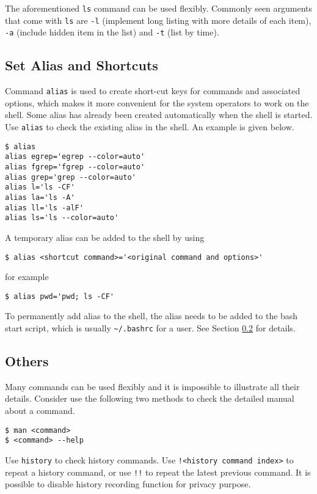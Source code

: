 The aforementioned \verb|ls| command can be used flexibly. Commonly seen arguments that come with \verb|ls| are \verb|-l| (implement long listing with more details of each item), \verb|-a| (include hidden item in the list) and \verb|-t| (list by time).

\subsection{Set Alias and Shortcuts}

Command \verb|alias| is used to create short-cut keys for commands and associated options, which makes it more convenient for the system operators to work on the shell. Some alias has already been created automatically when the shell is started. Use \verb|alias| to check the existing alias in the shell. An example is given below.

\begin{verbatim}
$ alias
alias egrep='egrep --color=auto'
alias fgrep='fgrep --color=auto'
alias grep='grep --color=auto'
alias l='ls -CF'
alias la='ls -A'
alias ll='ls -alF'
alias ls='ls --color=auto'
\end{verbatim}

A temporary alias can be added to the shell by using
\begin{verbatim}
$ alias <shortcut command>='<original command and options>'
\end{verbatim}
for example
\begin{verbatim}
$ alias pwd='pwd; ls -CF'
\end{verbatim}

To permanently add alias to the shell, the alias needs to be added to the bash start script, which is usually \verb|~/.bashrc| for a user. See Section \ref{ch2subsec:others} for details.

\subsection{Others}\label{ch2subsec:others}

Many commands can be used flexibly and it is impossible to illustrate all their details. Consider use the following two methods to check the detailed manual about a command.
\begin{verbatim}
$ man <command>
$ <command> --help
\end{verbatim}

Use \verb|history| to check history commands. Use \verb|!<history command index>| to repeat a history command, or use \verb|!!| to repeat the latest previous command. It is possible to disable history recording function for privacy purpose.

